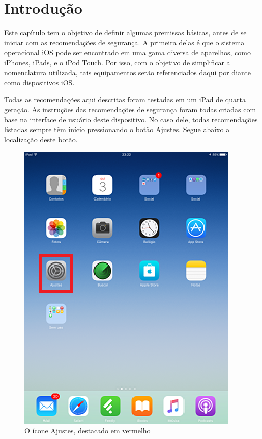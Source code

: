 \chapter{Introdu\c c\~ao}

Este cap\'itulo tem o objetivo de definir algumas premissas b\'asicas, antes de se iniciar com as recomenda\c c\~oes de seguran\c ca. A primeira delas \'e que o sistema operacional iOS pode ser encontrado em uma gama diversa de aparelhos, como iPhones, iPads, e o iPod Touch. Por isso, com o objetivo de simplificar a nomenclatura utilizada, tais equipamentos ser\~ao referenciados daqui por diante como dispositivos iOS. 

Todas as recomenda\c c\~oes aqui descritas foram testadas em um iPad de quarta gera\c c\~ao. As instru\c c\~oes das recomenda\c c\~oes de seguran\c ca foram todas criadas com base na interface de usu\'ario deste dispositivo. No caso dele, todas recomenda\c c\~oes listadas sempre t\^em in\'icio pressionando o bot\~ao Ajustes. Segue abaixo a localiza\c c\~ao deste bot\~ao.

\begin{figure}[h]
  \centering
  \includegraphics{imagem1.eps}
  \caption{O \'icone Ajustes, destacado em vermelho}
\end{figure}

